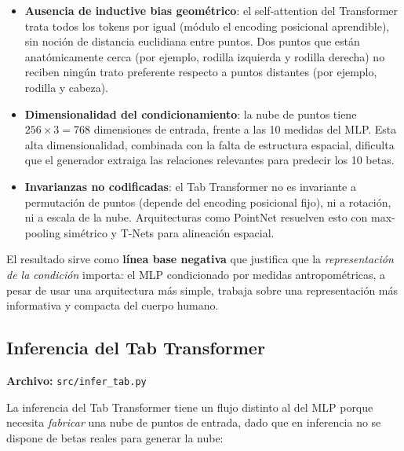 \documentclass[a4paper,11pt]{article}
\begin{document}
\begin{itemize}
    \item \textbf{Ausencia de inductive bias geométrico}: el self-attention
          del Transformer trata todos los tokens por igual (módulo el
          encoding posicional aprendible), sin noción de distancia
          euclidiana entre puntos. Dos puntos que están anatómicamente
          cerca (por ejemplo, rodilla izquierda y rodilla derecha) no
          reciben ningún trato preferente respecto a puntos distantes
          (por ejemplo, rodilla y cabeza).

    \item \textbf{Dimensionalidad del condicionamiento}: la nube de
          puntos tiene $256 \times 3 = 768$ dimensiones de entrada,
          frente a las 10 medidas del MLP. Esta alta dimensionalidad,
          combinada con la falta de estructura espacial, dificulta que
          el generador extraiga las relaciones relevantes para predecir
          los 10 betas.

    \item \textbf{Invarianzas no codificadas}: el Tab Transformer no es
          invariante a permutación de puntos (depende del encoding
          posicional fijo), ni a rotación, ni a escala de la nube.
          Arquitecturas como PointNet resuelven esto con max-pooling
          simétrico y T-Nets para alineación espacial.
\end{itemize}

El resultado sirve como \textbf{línea base negativa} que justifica que la
\emph{representación de la condición} importa: el MLP condicionado por
medidas antropométricas, a pesar de usar una arquitectura más simple,
trabaja sobre una representación más informativa y compacta del cuerpo
humano.

\subsection{Inferencia del Tab Transformer}

\textbf{Archivo:} \texttt{src/infer\_tab.py}

La inferencia del Tab Transformer tiene un flujo distinto al del MLP porque
necesita \emph{fabricar} una nube de puntos de entrada, dado que en
inferencia no se dispone de betas reales para generar la nube:
\end{document}

